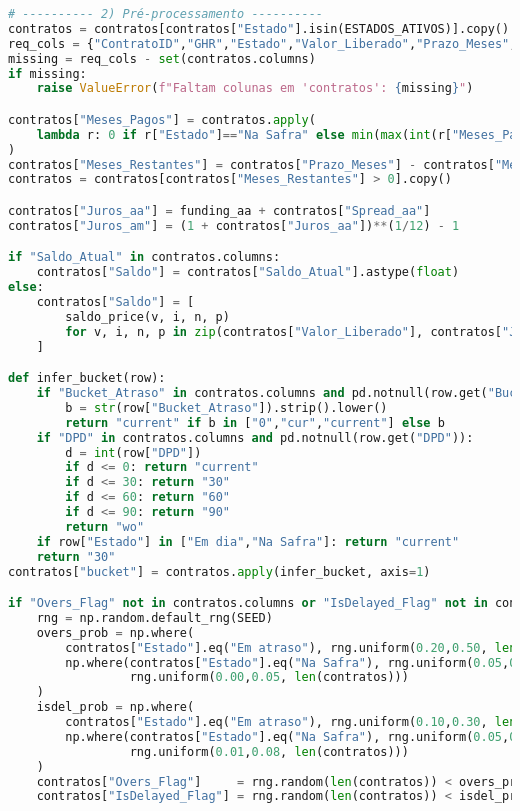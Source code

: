 \documentclass[11pt,a4paper]{article}
\newcommand{\1}{\mathbf{1}}
\begin{document}
\begin{lstlisting}[language=Python, caption={risk_frontier.py}]
# ---------- 2) Pré-processamento ----------
contratos = contratos[contratos["Estado"].isin(ESTADOS_ATIVOS)].copy()
req_cols = {"ContratoID","GHR","Estado","Valor_Liberado","Prazo_Meses","Meses_Pagos"}
missing = req_cols - set(contratos.columns)
if missing:
    raise ValueError(f"Faltam colunas em 'contratos': {missing}")

contratos["Meses_Pagos"] = contratos.apply(
    lambda r: 0 if r["Estado"]=="Na Safra" else min(max(int(r["Meses_Pagos"]), 0), int(r["Prazo_Meses"])-1), axis=1
)
contratos["Meses_Restantes"] = contratos["Prazo_Meses"] - contratos["Meses_Pagos"]
contratos = contratos[contratos["Meses_Restantes"] > 0].copy()

contratos["Juros_aa"] = funding_aa + contratos["Spread_aa"]
contratos["Juros_am"] = (1 + contratos["Juros_aa"])**(1/12) - 1

if "Saldo_Atual" in contratos.columns:
    contratos["Saldo"] = contratos["Saldo_Atual"].astype(float)
else:
    contratos["Saldo"] = [
        saldo_price(v, i, n, p)
        for v, i, n, p in zip(contratos["Valor_Liberado"], contratos["Juros_am"], contratos["Prazo_Meses"], contratos["Meses_Pagos"])
    ]

def infer_bucket(row):
    if "Bucket_Atraso" in contratos.columns and pd.notnull(row.get("Bucket_Atraso")):
        b = str(row["Bucket_Atraso"]).strip().lower()
        return "current" if b in ["0","cur","current"] else b
    if "DPD" in contratos.columns and pd.notnull(row.get("DPD")):
        d = int(row["DPD"])
        if d <= 0: return "current"
        if d <= 30: return "30"
        if d <= 60: return "60"
        if d <= 90: return "90"
        return "wo"
    if row["Estado"] in ["Em dia","Na Safra"]: return "current"
    return "30"
contratos["bucket"] = contratos.apply(infer_bucket, axis=1)

if "Overs_Flag" not in contratos.columns or "IsDelayed_Flag" not in contratos.columns:
    rng = np.random.default_rng(SEED)
    overs_prob = np.where(
        contratos["Estado"].eq("Em atraso"), rng.uniform(0.20,0.50, len(contratos)),
        np.where(contratos["Estado"].eq("Na Safra"), rng.uniform(0.05,0.15, len(contratos)),
                 rng.uniform(0.00,0.05, len(contratos)))
    )
    isdel_prob = np.where(
        contratos["Estado"].eq("Em atraso"), rng.uniform(0.10,0.30, len(contratos)),
        np.where(contratos["Estado"].eq("Na Safra"), rng.uniform(0.05,0.20, len(contratos)),
                 rng.uniform(0.01,0.08, len(contratos)))
    )
    contratos["Overs_Flag"]     = rng.random(len(contratos)) < overs_prob
    contratos["IsDelayed_Flag"] = rng.random(len(contratos)) < isdel_prob


\end{lstlisting}
\end{document}
